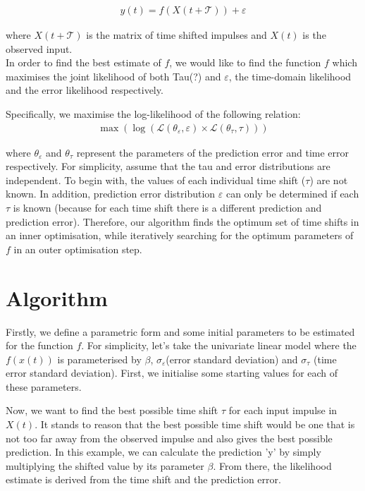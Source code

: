 \documentclass[11pt]{amsart}
\begin{document}
\begin{align}
y(t)= f(X(t + \mathcal{T})) + \varepsilon
\end{align}

where $X(t + \mathcal{T})$ is the matrix of time shifted impulses and $X(t)$ is the observed input.\\

In order to find the best estimate of $f$, we would like to find the function $f$ which maximises the joint likelihood of both Tau(?) and $\varepsilon$, the time-domain likelihood and the error likelihood respectively.

Specifically, we maximise the log-likelihood of the following relation:
\begin{align}
\max  \left( \log \left(\mathcal{L}(\theta_{\varepsilon}, \varepsilon) \times \mathcal{L}(\theta_{\tau}, \tau)\right) \right)
\end{align}

where $\theta_{\varepsilon}$ and $\theta_{\tau}$ represent the parameters of the prediction error and time error respectively. For simplicity, assume that the tau and error distributions are independent. To begin with, the values of each individual time shift ($\tau$) are not known. In addition, prediction error distribution $\varepsilon$ can only be determined if each $\tau$ is known (because for each time shift there is a different prediction and prediction error). Therefore, our algorithm finds the optimum set of time shifts  in an inner optimisation, while iteratively searching for the optimum parameters of $f$ in an outer optimisation step. 

\section{Algorithm}

Firstly, we define a parametric form and some initial parameters to be estimated for the function $f$. For simplicity, let's take the univariate linear model where the $f(x(t))$ is parameterised by $\beta$, $\sigma_{\varepsilon}$(error standard deviation)  and $\sigma_{\tau}$ (time error standard deviation). First, we initialise some starting values for each of these parameters.

Now, we want to find the best possible time shift $\tau$ for each input impulse in $X(t)$. It stands to reason that the best possible time shift would be one that is not too far away from the observed impulse and also gives the best possible prediction. In this example, we can calculate the prediction 'y' by simply multiplying the shifted value by its parameter $\beta$. From there, the likelihood estimate is derived from the time shift and the prediction error.
\end{document}
